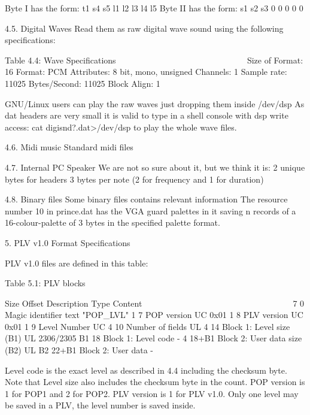  Byte I  has the form: t1 s4 s5 l1 l2 l3 l4 l5
 Byte II has the form: s1 s2 s3  0  0  0  0  0

4.5. Digital Waves
 Read them as raw digital wave sound using the following specifications:

                   Table 4.4: Wave Specifications
                   ~~~~~~~~~~~~~~~~~~~~~~~~~~~~~~
  Size of Format: 16
  Format:         PCM
  Attributes:     8 bit, mono, unsigned
  Channels:       1
  Sample rate:    11025
  Bytes/Second:   11025
  Block Align:    1

 GNU/Linux users can play the raw waves just dropping them inside /dev/dsp
 As dat headers are very small it is valid to type in a shell console with
 dsp write access: cat digisnd?.dat>/dev/dsp to play the whole wave files.

4.6. Midi music
 Standard midi files

4.7. Internal PC Speaker
 We are not so sure about it, but we think it is:
  2 unique bytes for headers
  3 bytes per note (2 for frequency and 1 for duration)

4.8. Binary files
 Some binary files contains relevant information
 The resource number 10 in prince.dat has the VGA guard palettes in it
 saving n records of a 16-colour-palette of 3 bytes in the specified
 palette format.


5. PLV v1.0 Format Specifications
   ~~~ ~~~~ ~~~~~~ ~~~~~~~~~~~~~~

 PLV v1.0 files are defined in this table:

                   Table 5.1: PLV blocks
                   ~~~~~~~~~~~~~~~~~~~~~

   Size Offset Description                  Type   Content
   ~~~~ ~~~~~~ ~~~~~~~~~~~                  ~~~~   ~~~~~~~
      7      0 Magic identifier             text   "POP_LVL"
      1      7 POP version                  UC     0x01
      1      8 PLV version                  UC     0x01
      1      9 Level Number                 UC
      4     10 Number of fields             UL
      4     14 Block 1: Level size (B1)     UL     2306/2305
     B1     18 Block 1: Level code          -
      4  18+B1 Block 2: User data size (B2) UL
     B2  22+B1 Block 2: User data           -

 Level code is the exact level as described in 4.4 including the checksum
 byte. Note that Level size also includes the checksum byte in the count.
 POP version is 1 for POP1 and 2 for POP2.
 PLV version is 1 for PLV v1.0.
 Only one level may be saved in a PLV, the level number is saved inside.

